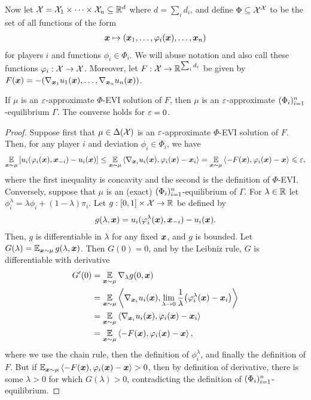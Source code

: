 Now let ${\mathcal{X}} = {\mathcal{X}}_1 \times \dots \times {\mathcal{X}}_n \subseteq \mathbb R^d$ where $d = \sum_i d_i$, and define $\Phi \subseteq {\mathcal{X}}^{\mathcal{X}}$ to be the set of all functions of the form 
    \begin{align*}
        {\bm{x}} \mapsto ({\bm{x}}_1, \dots, \varphi_i({\bm{x}}), \dots, {\bm{x}}_n)
    \end{align*}
for players $i$ and functions $\phi_i \in \Phi_i$. We will abuse notation and also call these functions $\varphi_i : {\mathcal{X}} \to {\mathcal{X}}$. Moreover, let $F : {\mathcal{X}} \to \mathbb R^{\sum_i d_i}$ be given by $F({\bm{x}}) = -\qty(\nabla_{{\bm{x}}_1} u_1({\bm{x}}), \dots, \nabla_{{\bm{x}}_n} u_n({\bm{x}}))$.
\begin{proposition}\label{prop:evi phi equivalence convex}
    If $\mu$ is an $\varepsilon$-approximate $\Phi$-EVI solution of $F$, then $\mu$ is an $\varepsilon$-approximate $(\Phi_i)_{i=1}^n$-equilibrium $\Gamma$. The converse holds for $\varepsilon = 0$. 
\end{proposition}
\begin{proof}
    Suppose first that $\mu \in \Delta({\mathcal{X}})$ is an $\varepsilon$-approximate $\Phi$-EVI solution of $F$. Then, for any player $i$ and deviation $\phi_i \in \Phi_i$, we have
    \begin{align*}
        \E_{ \vx \sim \mu } \qty[u_i(\phi_i(\vx), \vx_{-i}) - u_i(\vx)] \leq \E_{\vx\sim\mu} \ip{\grad_{\vx_i} u_i(\vx), \phi_i(\vx) - \vx_i} = \E_{\vx\sim\mu} \ip{-F(\vx), \phi_i(\vx) - \vx} \le \eps,
    \end{align*}
    where the first inequality is concavity and the second is the definition of $\Phi$-EVI. Conversely, suppose that $\mu$ is an (exact) $(\Phi_i)_{i=1}^n$-equilibrium of $\Gamma$. For $\lambda \in \mathbb R$ let $\phi_i^\lambda = \lambda \phi_i + (1 - \lambda) \pi_i$. Let $g : [0, 1] \times {\mathcal{X}} \to \mathbb R$ be defined by
    \begin{align*}
        g(\lambda, {\bm{x}}) = u_i(\varphi_i^\lambda({\bm{x}}), {\bm{x}}_{-i}) - u_i({\bm{x}}).
    \end{align*}
    Then, $g$ is differentiable in $\lambda$ for any fixed ${\bm{x}}$, and $g$ is bounded. Let $G(\lambda) = \operatorname*{\mathbb E}_{{\bm{x}}\sim\mu} g(\lambda, {\bm{x}})$. Then $G(0) = 0$, and by the Leibniz rule, $G$ is differentiable with derivative
    \begin{align*}
        G'(0) &= \E_{\vx\sim\mu} \grad_\lambda g(0, \vx) 
        \\&=  \E_{ \vx \sim \mu }  \ip{\grad_{\vx_i} u_i(\vx), \lim_{\lambda \to 0} \frac{1}{\lambda} \qty( \phi_i^\lambda(\vx) - \vx_i)}
       \\&= \E_{ \vx \sim \mu } \ip{\grad_{\vx_i} u_i(\vx), \phi_i(\vx) - \vx_i} 
       \\&= \E_{\vx\sim\mu}\ip{-F(\vx), \phi_i(\vx) - \vx},
    \end{align*}
    where we use the chain rule, then the definition of $\phi_i^\lambda$, and finally the definition of $F$.    But if $\E_{\vx\sim\mu}\ip{-F(\vx), \phi_i(\vx) - \vx} > 0$, then by definition of derivative, there is some $\lambda > 0$ for which $G(\lambda) > 0$, contradicting the definition of $(\Phi_i)_{i=1}^n$-equilibrium.
\end{proof}

